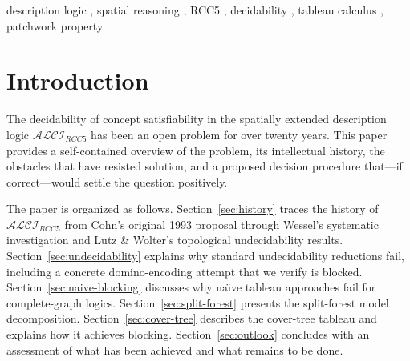 \documentclass[
]{ceurart}
\theoremstyle{definition}
\newcommand{\ALCI}{\ensuremath{\mathcal{ALCI}}}
\newcommand{\ALCIRCC}[1]{\ensuremath{\mathcal{ALCI}_{\mathit{RCC#1}}}}
\newcommand{\DR}{\ensuremath{\mathsf{DR}}}
\newcommand{\PO}{\ensuremath{\mathsf{PO}}}
\begin{document}
\begin{abstract}
The description logic $\ALCIRCC{5}$ extends $\ALCI$ with the five
RCC5 base relations as roles, under composition-table semantics.
Its decidability has been open since Wessel~(2002/2003).
We survey the history of the problem---from Cohn's original proposal
(1993) through Wessel's systematic investigation and Lutz \& Wolter's
related undecidability results (2006)---and explain why all known
undecidability reductions fail for $\ALCIRCC{5}$.
We then present a proposed decision procedure: the \emph{cover-tree
tableau}, which decomposes models into PPI-oriented cover trees
where only $\{\DR,\PO\}$ remain as open cross-edges.
This decomposition, combined with the patchwork property of RCC5,
yields finite blocking via rank-$d$ signatures.
The approach is supported by extensive computational evidence
(911~test concepts, zero mismatches; 775/775~SAT concepts with
cover-tree models) but has not been formally verified by human experts.
We discuss why na\"{\i}ve tableau approaches fail for
$\ALCIRCC{5}$ and how the cover-tree tableau overcomes these obstacles.
\end{abstract}

\begin{keywords}
  description logic \sep
  spatial reasoning \sep
  RCC5 \sep
  decidability \sep
  tableau calculus \sep
  patchwork property
\end{keywords}

\maketitle

\section{Introduction}
\label{sec:intro}

The decidability of concept satisfiability in the spatially extended
description logic $\ALCIRCC{5}$ has been an open problem for over
twenty years.  This paper provides a self-contained overview of the
problem, its intellectual history, the obstacles that have resisted
solution, and a proposed decision procedure that---if correct---would
settle the question positively.

The paper is organized as follows.
Section~\ref{sec:history} traces the history of $\ALCIRCC{5}$
from Cohn's original 1993 proposal through Wessel's systematic
investigation and Lutz \& Wolter's topological undecidability results.
Section~\ref{sec:undecidability} explains why standard undecidability
reductions fail, including a concrete domino-encoding attempt that
we verify is blocked.
Section~\ref{sec:naive-blocking} discusses why na\"{\i}ve tableau
approaches fail for complete-graph logics.
Section~\ref{sec:split-forest} presents the split-forest model
decomposition.
Section~\ref{sec:cover-tree} describes the cover-tree tableau and
explains how it achieves blocking.
Section~\ref{sec:outlook} concludes with an assessment of what
has been achieved and what remains to be done.
\end{document}
